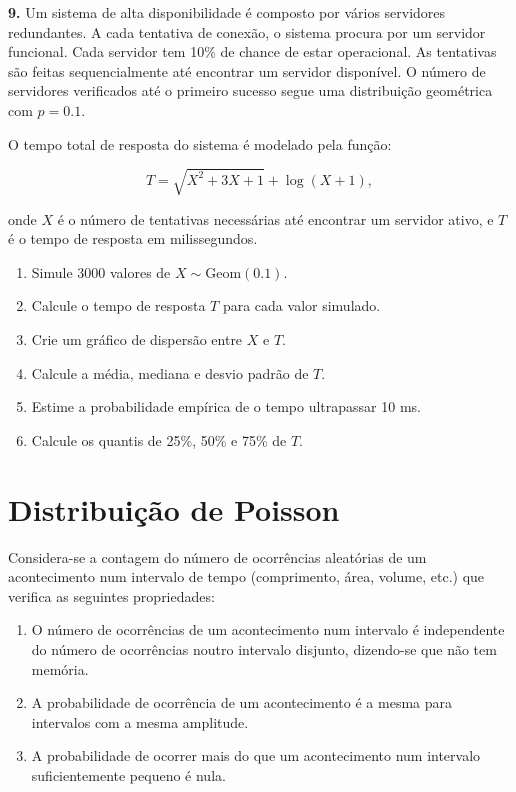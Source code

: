 \documentclass[
]{book}
\begin{document}
\textbf{9.} Um sistema de alta disponibilidade é composto por vários servidores redundantes. A cada tentativa de conexão, o sistema procura por um servidor funcional. Cada servidor tem 10\% de chance de estar operacional. As tentativas são feitas sequencialmente até encontrar um servidor disponível. O número de servidores verificados até o primeiro sucesso segue uma distribuição geométrica com \(p = 0.1\).

O tempo total de resposta do sistema é modelado pela função:

\[T = \sqrt{X^2 + 3X + 1} + \log(X + 1),\]

onde \(X\) é o número de tentativas necessárias até encontrar um servidor ativo, e \(T\) é o tempo de resposta em milissegundos.

\begin{enumerate}
\def\labelenumi{(\alph{enumi})}
\item
  Simule 3000 valores de \(X \sim \text{Geom}(0.1)\).
\item
  Calcule o tempo de resposta \(T\) para cada valor simulado.
\item
  Crie um gráfico de dispersão entre \(X\) e \(T\).
\item
  Calcule a média, mediana e desvio padrão de \(T\).
\item
  Estime a probabilidade empírica de o tempo ultrapassar 10 ms.
\item
  Calcule os quantis de 25\%, 50\% e 75\% de \(T\).
\end{enumerate}

\section{Distribuição de Poisson}\label{distribuiuxe7uxe3o-de-poisson}

Considera-se a contagem do número de ocorrências aleatórias de um acontecimento num intervalo de tempo (comprimento, área, volume, etc.) que verifica as seguintes propriedades:

\begin{enumerate}
\def\labelenumi{\arabic{enumi}.}
\item
  O número de ocorrências de um acontecimento num intervalo é independente do número de ocorrências noutro intervalo disjunto, dizendo-se que não tem memória.
\item
  A probabilidade de ocorrência de um acontecimento é a mesma para intervalos com a mesma amplitude.
\item
  A probabilidade de ocorrer mais do que um acontecimento num intervalo suficientemente pequeno é nula.
\end{enumerate}
\end{document}
